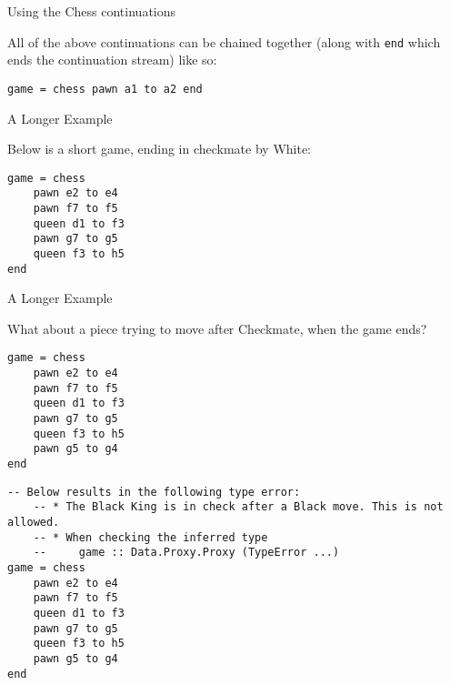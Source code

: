 \documentclass{beamer}
\newcommand{\inline}[1]{\lstinline[basicstyle=\ttfamily]{#1}}
\begin{document}
\begin{frame}[fragile]{Using the Chess continuations}

All of the above continuations can be chained together (along with \inline{end} which ends the continuation stream) like so:

\begin{lstlisting}
game = chess pawn a1 to a2 end
\end{lstlisting}

\end{frame}

\begin{frame}[fragile]{A Longer Example}

Below is a short game, ending in checkmate by White:

\begin{figure}[h]
    \centering
    \newgame
    \scalebox{0.55}{\showboard}
    \quad
    \scalebox{0.55}{\showboard}
    \label{threemovecheckmate}
\end{figure}

\pause

\begin{lstlisting}
game = chess
    pawn e2 to e4
    pawn f7 to f5
    queen d1 to f3
    pawn g7 to g5
    queen f3 to h5
end
\end{lstlisting}

\end{frame}

\begin{frame}[fragile]{A Longer Example}

What about a piece trying to move after Checkmate, when the game ends?

\begin{overprint}

\begin{lstlisting}
game = chess
    pawn e2 to e4
    pawn f7 to f5
    queen d1 to f3
    pawn g7 to g5
    queen f3 to h5
    pawn g5 to g4
end
\end{lstlisting}

\begin{lstlisting}
-- Below results in the following type error:
    -- * The Black King is in check after a Black move. This is not allowed.
    -- * When checking the inferred type
    --     game :: Data.Proxy.Proxy (TypeError ...)
game = chess
    pawn e2 to e4
    pawn f7 to f5
    queen d1 to f3
    pawn g7 to g5
    queen f3 to h5
    pawn g5 to g4
end
\end{lstlisting}

\end{overprint}

\end{frame}
\end{document}
